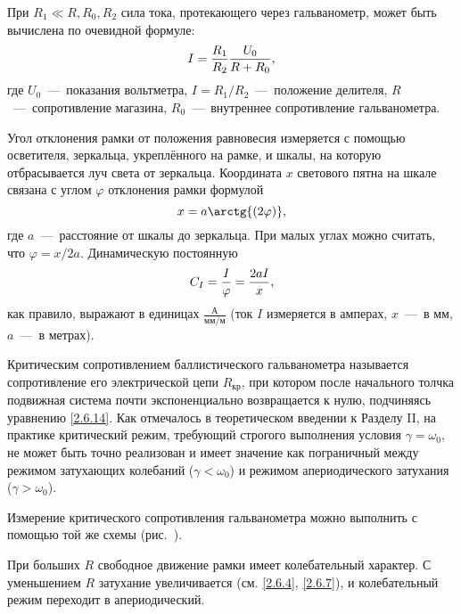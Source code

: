 При $R_1 \ll R, R_0, R_2$ сила тока, протекающего через гальванометр, может быть вычислена по
очевидной формуле:
\begin{equation}
	\eqmark{2.6.22}
	 I = \frac{R_1}{R_2} \frac{U_0}{R + R_0},
\end{equation}
где $U_0$~---~показания вольтметра, $I = R_1/R_2$~---~положение делителя, $R$~---~сопротивление магазина, $R_0$~---~внутреннее сопротивление гальванометра.

Угол отклонения рамки от положения равновесия измеряется с помощью
осветителя, зеркальца, укреплённого на рамке, и шкалы, на которую
отбрасывается луч света от зеркальца. Координата $x$ светового пятна на
шкале связана с углом $\varphi$ отклонения рамки формулой
\begin{equation}
	\eqmark{2.6.23}
	x = a \arctg{(2\varphi)},
\end{equation}
где $a$~---~расстояние от шкалы до зеркальца. При малых углах можно считать,
что $\varphi = x/2a$. Динамическую постоянную
\begin{equation}
	\eqmark{2.6.24}
	C_I = \frac{I}{\varphi} = \frac{2aI}{x},
\end{equation}
как правило, выражают в единицах $\frac{\text{А}}{\text{мм}/\text{м}}$ (ток $I$ измеряется в амперах, $x$~---~в мм, $a$~---~в
метрах).


Критическим сопротивлением баллистического гальванометра называется
сопротивление его электрической цепи $R_{\text{кр}}$, при котором после начального
толчка подвижная система почти экспоненциально возвращается к нулю,
подчиняясь уравнению \eqref{2.6.14}. Как отмечалось в теоретическом введении к
Разделу II, на практике критический режим, требующий строгого выполнения
условия $\gamma = \omega_0$, не может быть точно реализован и имеет значение как
пограничный между режимом затухающих колебаний ($\gamma < \omega_0$) и режимом
апериодического затухания ($\gamma > \omega_0$).

Измерение критического сопротивления гальванометра можно выполнить с
помощью той же схемы (рис.~).

При больших $R$ свободное движение рамки имеет колебательный
характер. С уменьшением $R$ затухание увеличивается (см. \eqref{2.6.4}, \eqref{2.6.7}),
и колебательный режим переходит в апериодический.

